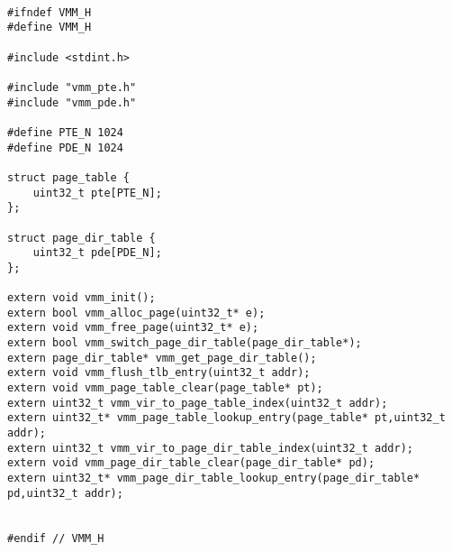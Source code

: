 \documentclass[document.tex]{subfiles}
\begin{document}
\begin{english}

\lstset{numberstyle=\tiny,numbers=left,stepnumber=1,numbersep=5pt,tabsize=2,extendedchars=true,breaklines=true,frame=b,showspaces=false, showtabs=false,xleftmargin=10pt,framexleftmargin=10pt,framexrightmargin=5pt,framexbottommargin=4pt,showstringspaces=false,language=C++}

\begin{lstlisting}[label=lst:vmm.h,caption=\en{Virtual  Memory Manager Interface}]

#ifndef VMM_H
#define VMM_H

#include <stdint.h>

#include "vmm_pte.h"
#include "vmm_pde.h"

#define PTE_N 1024
#define PDE_N 1024

struct page_table {
	uint32_t pte[PTE_N];
};

struct page_dir_table {
	uint32_t pde[PDE_N];
};

extern void vmm_init();
extern bool vmm_alloc_page(uint32_t* e); 
extern void vmm_free_page(uint32_t* e);
extern bool vmm_switch_page_dir_table(page_dir_table*);
extern page_dir_table* vmm_get_page_dir_table();
extern void vmm_flush_tlb_entry(uint32_t addr);
extern void vmm_page_table_clear(page_table* pt);
extern uint32_t vmm_vir_to_page_table_index(uint32_t addr);
extern uint32_t* vmm_page_table_lookup_entry(page_table* pt,uint32_t addr);
extern uint32_t vmm_vir_to_page_dir_table_index(uint32_t addr);
extern void vmm_page_dir_table_clear(page_dir_table* pd);
extern uint32_t* vmm_page_dir_table_lookup_entry(page_dir_table* pd,uint32_t addr);


#endif // VMM_H

\end{lstlisting}
\end{english}
\end{document}
